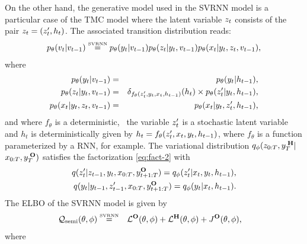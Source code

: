 \label{sec:svrnn}
On the other hand, the generative model used in the SVRNN model
is a particular case of the TMC model where the latent variable
$z_t$ consists of the pair $z_t=(z'_t, h_t)$. The associated
transition distribution reads:
\begin{align*}
 p_{\theta}(v_t|v_{t-1})  \overset{\rm \scriptscriptstyle SVRNN }{ = }p_{\theta}(y_t|v_{t-1}) p_{\theta}(z_t|y_t, v_{t-1}) p_{\theta}(x_t|y_t,z_t,v_{t-1}) \text{,}
\end{align*}
where 
\begin{eqnarray*}
p_{\theta}(y_t|v_{t-1})&=& p_{\theta}(y_t|h_{t-1})\text{,} \\
p_{\theta}(z_t|y_t,v_{t-1})&=&\delta_{f_{\theta}(z'_t,y_t,x_t,h_{t-1})}(h_t) \times p_{\theta}(z'_t|y_t, h_{t-1}) \text{,} \\
p_{\theta}(x_t|y_t,z_t,v_{t-1})&=& p_{\theta}(x_t|y_t, z'_t, h_{t-1}) \text{,}
\end{eqnarray*}
and where $f_{\theta}$ is a deterministic, 
\ie~the variable $z'_t$ is a stochastic latent variable 
and $h_t$ is deterministically given by 
$h_t = f_{\theta}( z'_t, x_t, y_t, h_{t-1})$, 
where $f_{\theta}$ is a function parameterized 
by a RNN, for example. 
The variational distribution $q_\phi(z_{0:T}, y_{T}^{\;\mathbf{H}}|$ $ x_{0:T}, y_{T}^{\;\mathbf{O}})$ satisfies
the factorization \eqref{eq:fact-2}
with
\begin{align*}
 q(z'_t|z_{t-1},y_{t},x_{0:T},y_{t+1:T}^{\mathbf{O}})=  q_\phi(z'_t| x_t, y_t, h_{t-1})\text{,} \\
q(y_t|y_{t-1},z'_{t-1},x_{0:T},y_{t+1:T}^{\mathbf{O}})= 
q_\phi(y_t| x_t, h_{t-1}) \text{.}
\end{align*}
The ELBO of the SVRNN model is given by
\begin{align*}
    \mathcal{Q}_{\mathrm{semi}}(\theta,\phi) \overset{\rm \scriptscriptstyle SVRNN }{=}& \quad
    \mathcal{L}^{\mathbf{O}}(\theta,\phi) + \mathcal{L}^{\mathbf{H}}(\theta,\phi) + J^{\mathbf{O}}(\theta,\phi) \text{,}
\end{align*}
where 
